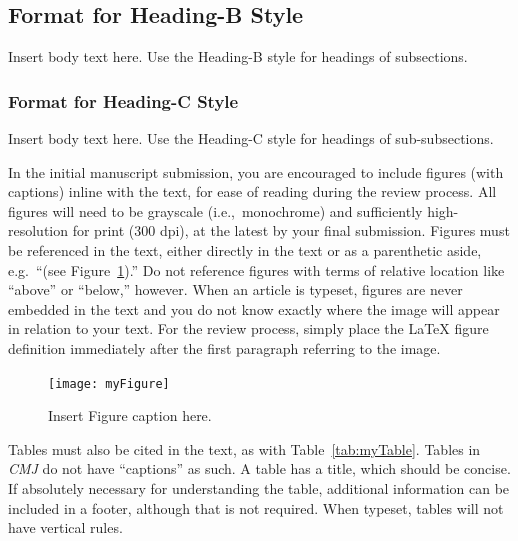 \documentclass[letterpaper, 12pt]{article}
\begin{document}

\subsection{Format for Heading-B Style}

Insert body text here.  
Use the Heading-B style for headings of subsections.

\subsubsection{Format for Heading-C Style}

Insert body text here.
Use the Heading-C style for headings of sub-subsections.

In the initial manuscript submission, you are encouraged to include figures (with captions) inline with the text, for ease of reading during the review process. 
All figures will need to be grayscale (i.e.,~monochrome) and sufficiently high-resolution for print (300 dpi), at the latest by your final submission.
Figures must be referenced in the text, either directly in the text or as a parenthetic aside, e.g.~``(see Figure~\ref{fig:myFigure}).''
Do not reference figures with terms of relative location like ``above'' or ``below,'' however.
When an article is typeset, figures are never embedded in the text and you do not know exactly where the image will appear in relation to your text.
For the review process, simply place the LaTeX figure definition immediately after the first paragraph referring to the image.

\begin{figure}[]
\begin{center}
\texttt{[image: myFigure]}
\caption{Insert Figure caption here.}
\label{fig:myFigure}
\end{center}
\end{figure}

Tables must also be cited in the text, as with Table~\ref{tab:myTable}. Tables in \emph{CMJ} do not have ``captions'' as such. A table has a title, which should be concise. If absolutely necessary for understanding the table, additional information can be included in a footer, although that is not required. When typeset, tables will not have vertical rules.
\end{document}
